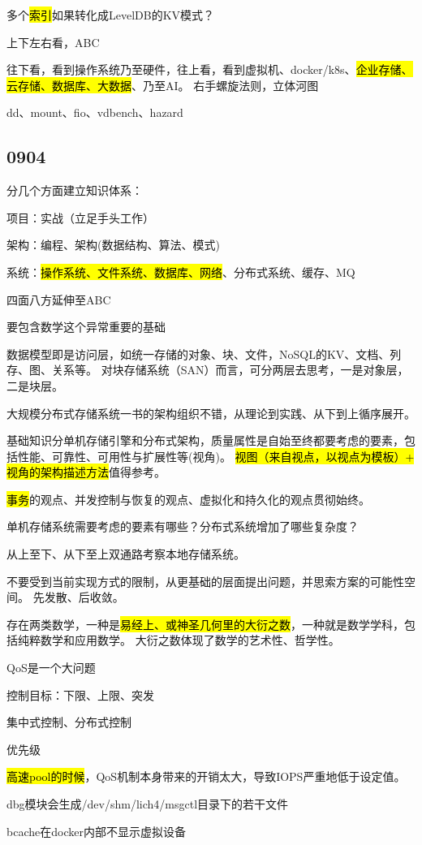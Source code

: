 多个\hl{索引}如果转化成LevelDB的KV模式？

上下左右看，ABC

往下看，看到操作系统乃至硬件，往上看，看到虚拟机、docker/k8s、\hl{企业存储、云存储、数据库、大数据}、乃至AI。
右手螺旋法则，立体河图

dd、mount、fio、vdbench、hazard

\subsection{0904}

分几个方面建立知识体系：
\begin{enumbox}
\item 项目：实战（立足手头工作）
\item 架构：编程、架构(数据结构、算法、模式)
\item 系统：\hl{操作系统、文件系统、数据库、网络}、分布式系统、缓存、MQ
\item 四面八方延伸至ABC
\item 要包含数学这个异常重要的基础
\end{enumbox}

数据模型即是访问层，如统一存储的对象、块、文件，NoSQL的KV、文档、列存、图、关系等。
对块存储系统（SAN）而言，可分两层去思考，一是对象层，二是块层。

大规模分布式存储系统一书的架构组织不错，从理论到实践、从下到上循序展开。

基础知识分单机存储引擎和分布式架构，质量属性是自始至终都要考虑的要素，包括性能、可靠性、可用性与扩展性等(视角)。
\hl{视图（来自视点，以视点为模板）+ 视角的架构描述方法}值得参考。

\hl{事务}的观点、并发控制与恢复的观点、虚拟化和持久化的观点贯彻始终。

单机存储系统需要考虑的要素有哪些？分布式系统增加了哪些复杂度？

从上至下、从下至上双通路考察本地存储系统。

不要受到当前实现方式的限制，从更基础的层面提出问题，并思索方案的可能性空间。
先发散、后收敛。

存在两类数学，一种是\hl{易经上、或神圣几何里的大衍之数}，一种就是数学学科，包括纯粹数学和应用数学。
大衍之数体现了数学的艺术性、哲学性。

QoS是一个大问题
\begin{enumbox}
\item 控制目标：下限、上限、突发
\item 集中式控制、分布式控制
\item 优先级
\item \hl{高速pool的时候}，QoS机制本身带来的开销太大，导致IOPS严重地低于设定值。
\item dbg模块会生成/dev/shm/lich4/msgctl目录下的若干文件
\item bcache在docker内部不显示虚拟设备
\end{enumbox}

